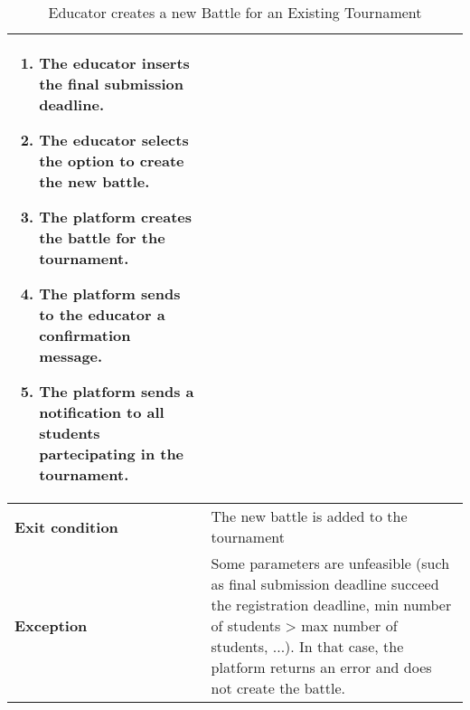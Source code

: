 \begin{enumerate}[label=\textbf{UC\arabic*}:,ref=UC\arabic*,leftmargin=1.3cm]
{\begin{table}[H]
\begin{tabular}{|l|p{11.9cm}|}
\begin{enumerate}[label=\arabic*.]
                              \item The educator inserts the final submission deadline.
                              \item The educator selects the option to create the new battle.
                              \item The platform creates the battle for the tournament.
                              \item The platform sends to the educator a confirmation message.
                              \item The platform sends a notification to all students partecipating in the tournament.
                        \end{enumerate}                                                                                                \\\hline
                        \textbf{Exit condition}  & The new battle is added to the tournament                                                                                                                   \\\hline
                        \textbf{Exception}       & Some parameters are unfeasible (such as final submission deadline succeed the registration deadline, min number of students > max number of students, ...).
                        In that case, the platform returns an error and does not create the battle.                                                                                                            \\\hline
                  \end{tabular}
                  \caption{Educator creates a new Battle for an Existing Tournament        }
                  \label{table:Educator creates a new Battle for an Existing Tournament         }
            \end{table}
            \pagebreak
            \begin{adjustbox}{
                        max size={\textwidth}{},
                        caption={Educator creates a new Battle for an Existing Tournament},
                        label={fig:Educator creates a new Battle for an Existing Tournament},
                        figure=H}
                  \centering
            \end{adjustbox}
            \pagebreak
      }
\end{enumerate}
